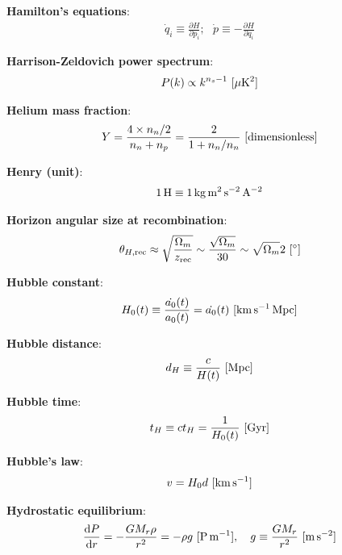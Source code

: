 \documentclass[a4paper,10pt]{article}
\begin{document}
{\noindent}\textbf{Hamilton's equations}:
\begin{align*}
    \dot{q}_i \equiv \frac{\partial H}{\partial p_i}; ~~~ \dot{p} \equiv -\frac{\partial H}{\partial q_i}
\end{align*}

{\noindent}\textbf{Harrison-Zeldovich power spectrum}:
\begin{align*}
    P(k) \propto k^{n_s-1} ~ [{\rm \mu K^2}]
\end{align*}

{\noindent}\textbf{Helium mass fraction}:
\begin{align*}
    Y = \frac{4\times n_n/2}{n_n + n_p}  = \frac{2}{1 + n_n/n_n} ~ [{\rm dimensionless}]
\end{align*}

{\noindent}\textbf{Henry (unit)}:
\begin{align*}
    {\rm 1\,H \equiv 1\,kg\,m^2\,s^{-2}\,A^{-2}}
\end{align*}

{\noindent}\textbf{Horizon angular size at recombination}:
\begin{align*}
    \theta_{H,\mathrm{rec}} \approx \sqrt{\frac{\Omega_m}{z_\mathrm{rec}}} \sim \frac{\sqrt{\Omega_m}}{30} \sim \sqrt{\Omega_m}2 ~ [{\rm ^\circ}]
\end{align*}

{\noindent}\textbf{Hubble constant}:
\begin{align*}
    H_0(t) \equiv \dfrac{\dot{a_0}(t)}{a_0(t)} = \dot{a_0}(t) ~ [{\rm km\,s^{-1}\,Mpc}]
\end{align*}

{\noindent}\textbf{Hubble distance}:
\begin{align*}
    d_H \equiv \frac{c}{H(t)} ~ [{\rm Mpc}]
\end{align*}

{\noindent}\textbf{Hubble time}:
\begin{align*}
    t_H \equiv ct_H = \frac{1}{H_0(t)} ~ [{\rm Gyr}]
\end{align*}

{\noindent}\textbf{Hubble's law}:
\begin{align*}
    v = H_0d ~ [{\rm km\,s^{-1}}]
\end{align*}

{\noindent}\textbf{Hydrostatic equilibrium}:
\begin{align*}
    \frac{{\rm d}P}{{\rm d}r} = -\frac{GM_r\rho}{r^2} = -\rho g ~ [{\rm P\,m^{-1}}], ~~~ g \equiv \frac{GM_r}{r^2} ~ [{\rm m\,s^{-2}}]
\end{align*}
\end{document}
